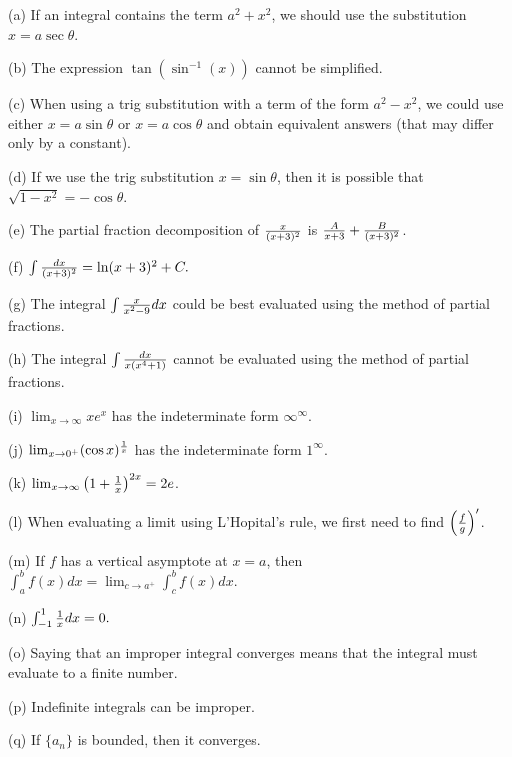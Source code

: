 \documentclass[12pt]{article}
\begin{document}
\noindent (a) If an integral contains the term $a^2+x^2$, we should use 
the substitution $x=a \sec \theta$.

\smallskip
\noindent (b) The expression $\tan \left ( \sin^{-1} (x) \right )$ cannot 
be simplified.

\smallskip
\noindent (c) When using a trig substitution with a term of the form 
$a^2-x^2$, we could use either $x=a \sin \theta$ or $x= a 
\cos \theta$ and obtain equivalent answers (that may differ only by a 
constant).

\smallskip
\noindent (d) If we use the trig substitution $x = \sin \theta$, then 
it is possible that $\sqrt{1-x^2} = -\cos \theta$. 

\smallskip
\noindent (e) The partial fraction decomposition of ${{x}\over{(x+3)^2}}$ 
is ${{A}\over{x+3}} + {{B}\over{(x+3)^2}}$.

\smallskip
\noindent (f) $\int {{dx}\over{(x+3)^2}} = \ln (x+3)^2 + C.$

\smallskip
\noindent (g) The integral $\int {{x}\over{x^2-9}} dx$ could be best 
evaluated using the method of partial fractions.

\smallskip
\noindent (h) The integral $\int {{dx}\over{x (x^4+1)}}$ cannot be 
evaluated using the method of partial fractions. 

\smallskip
\noindent (i) $\lim_{x \to \infty} xe^x$ has the indeterminate form 
$\infty^{\infty}$.

\smallskip
\noindent (j) $\lim_{x \to 0^+} (\cos x)^{{1}\over{x}}$ has the indeterminate 
form $1^{\infty}$.

\smallskip
\noindent (k) $\lim_{x \to \infty} \left ( 1 + {{1}\over{x}} \right )^{2x} = 
2e$.

\smallskip
\noindent (l) When evaluating a limit using L'Hopital's rule, we first need to 
find $\left ( {{f}\over{g}} \right )^{\prime}$. 

\smallskip
\noindent (m) If $f$ has a vertical asymptote at $x=a$, then $\int_a^b f(x) dx 
= \lim_{c \to a^+} \int_c^b f(x) dx$.

\smallskip
\noindent (n) $\int_{-1}^1 {{1}\over{x}} dx = 0.$

\smallskip
\noindent (o) Saying that an improper integral converges means that the 
integral must evaluate to a finite number.

\smallskip
\noindent (p) Indefinite integrals can be improper.

\smallskip
\noindent (q) If $\{a_n\}$ is bounded, then it converges.
\end{document}
